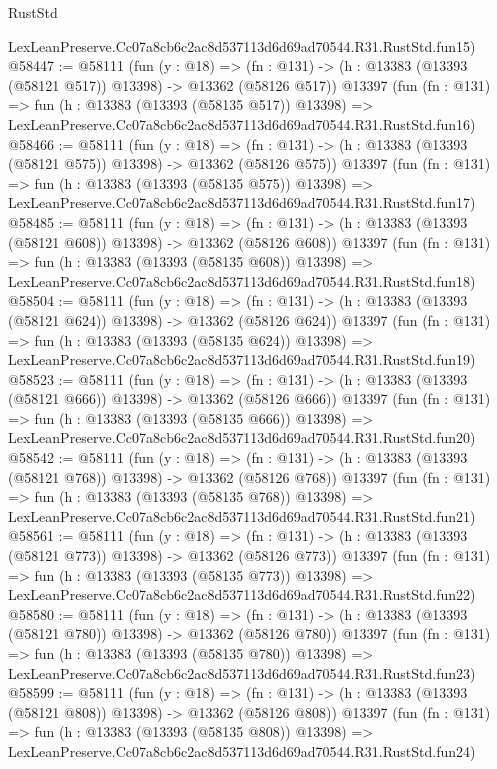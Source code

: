 \begin{lexlean}{RustStd}
\begin{coremodule}
    LexLeanPreserve.Cc07a8cb6c2ac8d537113d6d69ad70544.R31.RustStd.fun15)
@58447 := @58111
    (fun (y : @18) =>
    (fn : @131) -> (h : @13383 (@13393 (@58121 @517)) @13398) -> @13362 (@58126 @517))
    @13397
    (fun (fn : @131) =>
    fun (h : @13383 (@13393 (@58135 @517)) @13398) =>
    LexLeanPreserve.Cc07a8cb6c2ac8d537113d6d69ad70544.R31.RustStd.fun16)
@58466 := @58111
    (fun (y : @18) =>
    (fn : @131) -> (h : @13383 (@13393 (@58121 @575)) @13398) -> @13362 (@58126 @575))
    @13397
    (fun (fn : @131) =>
    fun (h : @13383 (@13393 (@58135 @575)) @13398) =>
    LexLeanPreserve.Cc07a8cb6c2ac8d537113d6d69ad70544.R31.RustStd.fun17)
@58485 := @58111
    (fun (y : @18) =>
    (fn : @131) -> (h : @13383 (@13393 (@58121 @608)) @13398) -> @13362 (@58126 @608))
    @13397
    (fun (fn : @131) =>
    fun (h : @13383 (@13393 (@58135 @608)) @13398) =>
    LexLeanPreserve.Cc07a8cb6c2ac8d537113d6d69ad70544.R31.RustStd.fun18)
@58504 := @58111
    (fun (y : @18) =>
    (fn : @131) -> (h : @13383 (@13393 (@58121 @624)) @13398) -> @13362 (@58126 @624))
    @13397
    (fun (fn : @131) =>
    fun (h : @13383 (@13393 (@58135 @624)) @13398) =>
    LexLeanPreserve.Cc07a8cb6c2ac8d537113d6d69ad70544.R31.RustStd.fun19)
@58523 := @58111
    (fun (y : @18) =>
    (fn : @131) -> (h : @13383 (@13393 (@58121 @666)) @13398) -> @13362 (@58126 @666))
    @13397
    (fun (fn : @131) =>
    fun (h : @13383 (@13393 (@58135 @666)) @13398) =>
    LexLeanPreserve.Cc07a8cb6c2ac8d537113d6d69ad70544.R31.RustStd.fun20)
@58542 := @58111
    (fun (y : @18) =>
    (fn : @131) -> (h : @13383 (@13393 (@58121 @768)) @13398) -> @13362 (@58126 @768))
    @13397
    (fun (fn : @131) =>
    fun (h : @13383 (@13393 (@58135 @768)) @13398) =>
    LexLeanPreserve.Cc07a8cb6c2ac8d537113d6d69ad70544.R31.RustStd.fun21)
@58561 := @58111
    (fun (y : @18) =>
    (fn : @131) -> (h : @13383 (@13393 (@58121 @773)) @13398) -> @13362 (@58126 @773))
    @13397
    (fun (fn : @131) =>
    fun (h : @13383 (@13393 (@58135 @773)) @13398) =>
    LexLeanPreserve.Cc07a8cb6c2ac8d537113d6d69ad70544.R31.RustStd.fun22)
@58580 := @58111
    (fun (y : @18) =>
    (fn : @131) -> (h : @13383 (@13393 (@58121 @780)) @13398) -> @13362 (@58126 @780))
    @13397
    (fun (fn : @131) =>
    fun (h : @13383 (@13393 (@58135 @780)) @13398) =>
    LexLeanPreserve.Cc07a8cb6c2ac8d537113d6d69ad70544.R31.RustStd.fun23)
@58599 := @58111
    (fun (y : @18) =>
    (fn : @131) -> (h : @13383 (@13393 (@58121 @808)) @13398) -> @13362 (@58126 @808))
    @13397
    (fun (fn : @131) =>
    fun (h : @13383 (@13393 (@58135 @808)) @13398) =>
    LexLeanPreserve.Cc07a8cb6c2ac8d537113d6d69ad70544.R31.RustStd.fun24)

\end{coremodule}
\end{lexlean}
